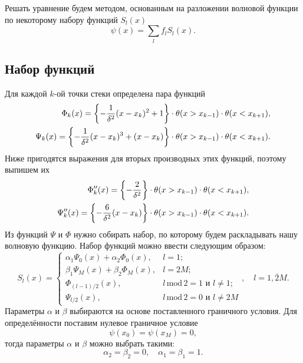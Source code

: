 \documentclass[10pt]{article}
\begin{document}
Решать уравнение будем методом, основанным на разложении волновой функции по некоторому набору функций $S_l(x)$
\begin{equation}
    \psi(x) = \sum\limits_{l} f_l S_l(x).
    \label{eq:decomp}
\end{equation}

\subsection{Набор функций}

Для каждой $k$-ой точки стеки определена пара функций
\begin{equation}
    \begin{split}
        \Phi_{k}(x) = \qty{-\dfrac{1}{\delta^2}(x-x_k)^2 + 1}\cdot \theta(x>x_{k-1}) \cdot \theta(x<x_{k+1}),\\
        \Psi_{k}(x) = \qty{- \dfrac{1}{\delta^2}(x-x_k)^3 + (x-x_k)} \cdot \theta(x>x_{k-1}) \cdot \theta(x<x_{k+1}).\\
    \end{split}
\end{equation}
Ниже пригодятся выражения для вторых производных этих функций, поэтому выпишем их
\begin{equation}
    \begin{split}
        \Phi^{\prime\prime}_{k}(x) = \qty{- \dfrac{2}{\delta^2}} \cdot \theta(x>x_{k-1}) \cdot \theta(x<x_{k+1}),\\
        \Psi^{\prime\prime}_{k}(x) = \qty{- \dfrac{6}{\delta^2}(x-x_k)} \cdot \theta(x>x_{k-1}) \cdot \theta(x<x_{k+1}).\\
    \end{split}
\end{equation}
Из функций $\Psi$ и $\Phi$ нужно собирать набор, по которому будем раскладывать нашу волновую функцию. Набор функций можно ввести следующим образом:
\begin{equation}
    S_l(x) =
    \begin{cases}
        \alpha_1 \Psi_0(x) + \alpha_2 \Phi_0(x), &l=1;\\
        \beta_1 \Psi_M(x) + \beta_2 \Phi_M(x), &l=2M;\\
         \Phi_{(l-1)/2}(x), &{l\,\textrm{mod}\,2 = 1\textrm{ и }l\ne 1};\\
        \Psi_{l/2}(x), &{l\,\textrm{mod}\,2 = 0\textrm{ и }l\ne 2M}
    \end{cases}
    ,\quad l = \overline{1, 2M}.
\end{equation}
Параметры $\alpha$ и $\beta$ выбираются на основе поставленного граничного условия. Для определённости поставим нулевое граничное условие
\begin{equation}
    \psi(x_0) = \psi(x_M) = 0,
\end{equation}
тогда параметры $\alpha$ и $\beta$ можно выбрать такими:
\begin{equation}
    \alpha_2=\beta_2=0,\quad \alpha_1=\beta_1=1.
\end{equation}
\end{document}
